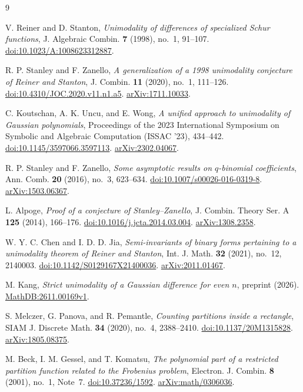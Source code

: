 \documentclass[3p,11pt,number]{elsarticle}
\theoremstyle{remark}
\numberwithin{equation}{section}
\begin{document}
\begin{thebibliography}{9}

V. Reiner and D. Stanton,
\emph{Unimodality of differences of specialized Schur functions},
J. Algebraic Combin. \textbf{7} (1998), no.~1, 91--107.
\href{https://doi.org/10.1023/A:1008623312887}{doi:10.1023/A:1008623312887}.

R. P. Stanley and F. Zanello,
\emph{A generalization of a 1998 unimodality conjecture of Reiner
and Stanton},
J. Combin. \textbf{11} (2020), no.~1, 111--126.
\href{https://doi.org/10.4310/JOC.2020.v11.n1.a5}{doi:10.4310/JOC.2020.v11.n1.a5}.
\href{https://arxiv.org/abs/1711.10033}{arXiv:1711.10033}.

C. Koutschan, A. K. Uncu, and E. Wong,
\emph{A unified approach to unimodality of Gaussian polynomials},
Proceedings of the 2023 International Symposium on Symbolic and
Algebraic Computation (ISSAC '23), 434--442.
\href{https://doi.org/10.1145/3597066.3597113}{doi:10.1145/3597066.3597113}.
\href{https://arxiv.org/abs/2302.04067}{arXiv:2302.04067}.

R. P. Stanley and F. Zanello,
\emph{Some asymptotic results on \(q\)-binomial coefficients},
Ann. Comb. \textbf{20} (2016), no.~3, 623--634.
\href{https://doi.org/10.1007/s00026-016-0319-8}{doi:10.1007/s00026-016-0319-8}.
\href{https://arxiv.org/abs/1503.06367}{arXiv:1503.06367}.

L. Alpoge,
\emph{Proof of a conjecture of Stanley--Zanello},
J. Combin. Theory Ser. A \textbf{125} (2014), 166--176.
\href{https://doi.org/10.1016/j.jcta.2014.03.004}{doi:10.1016/j.jcta.2014.03.004}.
\href{https://arxiv.org/abs/1308.2358}{arXiv:1308.2358}.

W. Y. C. Chen and I. D. D. Jia,
\emph{Semi-invariants of binary forms pertaining to a unimodality
theorem of Reiner and Stanton},
Int. J. Math. \textbf{32} (2021), no.~12, 2140003.
\href{https://doi.org/10.1142/S0129167X21400036}{doi:10.1142/S0129167X21400036}.
\href{https://arxiv.org/abs/2011.01467}{arXiv:2011.01467}.

M. Kang,
\emph{Strict unimodality of a Gaussian difference for even $n$},
preprint (2026).
\href{https://mathdb.com/abs/2611.00169v1}{MathDB:2611.00169v1}.

S. Melczer, G. Panova, and R. Pemantle,
\emph{Counting partitions inside a rectangle},
SIAM J. Discrete Math. \textbf{34} (2020), no.~4, 2388--2410.
\href{https://doi.org/10.1137/20M1315828}{doi:10.1137/20M1315828}.
\href{https://arxiv.org/abs/1805.08375}{arXiv:1805.08375}.

M. Beck, I. M. Gessel, and T. Komatsu,
\emph{The polynomial part of a restricted partition function related
to the Frobenius problem},
Electron. J. Combin. \textbf{8} (2001), no.~1, Note~7.
\href{https://doi.org/10.37236/1592}{doi:10.37236/1592}.
\href{https://arxiv.org/abs/math/0306036}{arXiv:math/0306036}.

\end{thebibliography}
\end{document}
